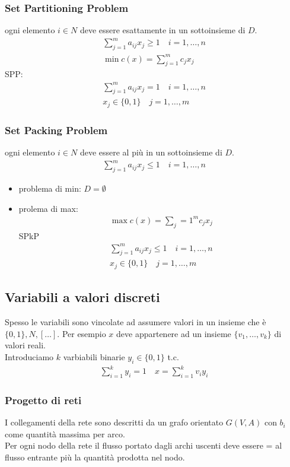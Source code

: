 \documentclass[a4paper,12pt]{article}
\begin{document}
\subsubsection*{Set Partitioning Problem}
ogni elemento $i \in N$ deve essere esattamente in un sottoinsieme di $D$.
\begin{align*}
    \sum_{j=1}^m a_{ij}x_j \geq 1 \quad i = 1,\dots, n \\
      \min c(x)= \sum_{j=1}^m c_j x_j
\end{align*}
SPP:
\begin{align*}
      \sum_{j=1}^m a_{ij}x_j = 1 \quad i = 1,\dots, n \\
      x_j \in \{0,1\} \quad j=1,\dots,m
\end{align*}
\subsubsection*{Set Packing Problem}
ogni elemento $i \in N$ deve essere al più in un sottoinsieme di $D$.
\begin{align*}
  \sum_{j=1}^m a_{ij}x_j \leq 1 \quad i=1,\dots,n
\end{align*}
\begin{itemize}
  \item problema di min: $D = \emptyset$
  \item prolema di max:
  \begin{align*}
    \max c(x) = \sum_j=1^m c_j x_j
  \end{align*} 
  SPkP
  \begin{align*}
      \sum_{j=1}^m a_{ij}x_j \leq 1 \quad i=1,\dots,n\\
      x_j \in \{0,1\} \quad j=1,\dots,m
  \end{align*}
\end{itemize}
\subsection*{Variabili a valori discreti}
Spesso le variabili sono vincolate ad assumere valori in un insieme che è $\{0,1\}, N, [\dots]$. Per esempio $x$ deve appartenere ad un insieme $\{v_1,\dots,v_k\}$ di valori reali.\\
Introduciamo $k$ varbiabili binarie $y_i \in \{0,1\}$ t.c.
\begin{align*}
    \sum_{i=1}^ky_i = 1 \quad x= \sum_{i=1}^k v_i y_i
\end{align*}
\subsubsection{Progetto di reti}
I collegamenti della rete sono descritti da un grafo orientato $G(V,A)$ con $b_i$ come quantità massima per arco. \\
Per ogni nodo della rete il flusso portato dagli archi uscenti deve essere = al flusso entrante più la quantità prodotta nel nodo.
\end{document}
